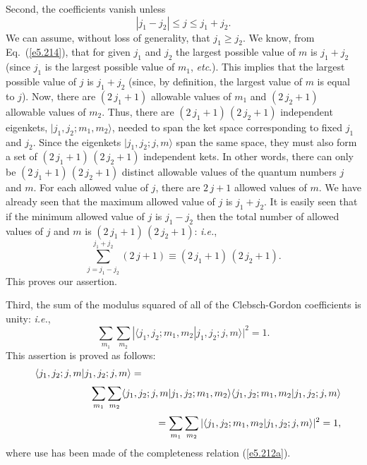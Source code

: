 Second, the coefficients vanish unless
\begin{equation}\label{e5.217}
|j_1-j_2| \leq j \leq j_1+j_2.
\end{equation}
We can assume, without loss of generality, that $j_1\geq j_2$. We know,
from Eq.~(\ref{e5.214}), that for given
$j_1$ and $j_2$ the largest possible value of $m$ is $j_1+j_2$ (since
$j_1$ is the largest possible value of $m_1$, {\em etc}.). This implies that
the largest possible value of $j$ is $j_1+j_2$ (since, by definition,
the largest value of $m$ is equal to $j$).
Now, there are $(2\,j_1+1)$ allowable values of $m_1$ and $(2\,j_2+1)$ allowable
values of $m_2$. Thus, there are $(2\,j_1+1)\,(2\,j_2+1)$ independent
eigenkets, $|j_1, j_2; m_1, m_2\rangle$, needed to span the ket space
corresponding to fixed $j_1$ and $j_2$. Since the eigenkets
$|j_1, j_2; j, m\rangle$ span the same space, they must also form
a set of  $(2\,j_1+1)\,(2\,j_2+1)$ independent kets. In other words, there
can only be $(2\,j_1+1)\,(2\,j_2+1)$ distinct  allowable values of the quantum numbers
$j$ and $m$. For each allowed value of $j$, there are $2\,j+1$ allowed values
of $m$. We have already seen that the maximum allowed value of $j$ is
$j_1+j_2$. It is easily seen that if the minimum allowed value of
$j$ is $j_1-j_2$ then the total number of allowed values of $j$ and $m$
is  $(2\,j_1+1)\,(2\,j_2+1)$: {\em i.e.},
\begin{equation}
\sum_{j=j_1-j_2}^{j_1+j_2} (2\,j+1) \equiv (2\,j_1+1)\,(2\,j_2+1).
\end{equation}
This proves our assertion. 

Third, the sum of the modulus squared of all of the Clebsch-Gordon coefficients
is unity: {\em i.e.},
\begin{equation}\label{e5.219}
\sum_{m_1}\sum_{m_2} |\langle j_1,j_2;m_1,m_2|j_1,j_2;j,m\rangle|^2 =1.
\end{equation}
This assertion is proved as follows:
\begin{eqnarray}
&&\langle j_1, j_2; j, m| j_1, j_2; j, m\rangle =\mbox{\hspace{7cm}}\nonumber\\[0.5ex] 
&&\sum_{m_1}\sum_{m_2} \langle j_1, j_2; j, m|j_1, j_2; m_1, m_2\rangle
\langle j_1, j_2; m_1, m_2|j_1, j_2; j, m\rangle\nonumber\\[0.5ex]
&&~~~=\sum_{m_1}\sum_{m_2}  |\langle j_1,j_2;m_1,m_2|j_1,j_2;j,m\rangle|^2 =1,
\end{eqnarray}
where use has been made of the completeness relation (\ref{e5.212a}).

